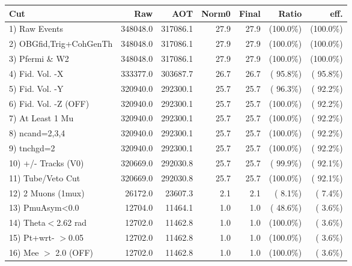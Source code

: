  \begin{table}[h!]\centering
 \begin{tabular}{||l||r|r|r|r|r|r||}
 \hline
 \hline
 Cut & Raw & AOT & Norm0 & Final & Ratio & eff.       \\
 \hline
  1) Raw Events           &     348048.0 &     317086.1 &         27.9 &         27.9 & (100.0\%) & (100.0\%) \\
  2) OBGfid,Trig+CohGenTh &     348048.0 &     317086.1 &         27.9 &         27.9 & (100.0\%) & (100.0\%) \\
  3) Pfermi \& W2         &     348048.0 &     317086.1 &         27.9 &         27.9 & (100.0\%) & (100.0\%) \\
  4) Fid. Vol. -X         &     333377.0 &     303687.7 &         26.7 &         26.7 & ( 95.8\%) & ( 95.8\%) \\
  5) Fid. Vol. -Y         &     320940.0 &     292300.1 &         25.7 &         25.7 & ( 96.3\%) & ( 92.2\%) \\
  6) Fid. Vol. -Z (OFF)   &     320940.0 &     292300.1 &         25.7 &         25.7 & (100.0\%) & ( 92.2\%) \\
  7) At Least 1 Mu        &     320940.0 &     292300.1 &         25.7 &         25.7 & (100.0\%) & ( 92.2\%) \\
  8) ncand=2,3,4          &     320940.0 &     292300.1 &         25.7 &         25.7 & (100.0\%) & ( 92.2\%) \\
  9) tnchgd=2             &     320940.0 &     292300.1 &         25.7 &         25.7 & (100.0\%) & ( 92.2\%) \\
 10) +/- Tracks (V0)      &     320669.0 &     292030.8 &         25.7 &         25.7 & ( 99.9\%) & ( 92.1\%) \\
 11) Tube/Veto Cut        &     320669.0 &     292030.8 &         25.7 &         25.7 & (100.0\%) & ( 92.1\%) \\
 12) 2 Muons (1mux)       &      26172.0 &      23607.3 &          2.1 &          2.1 & (  8.1\%) & (  7.4\%) \\
 13) PmuAsym<0.0          &      12704.0 &      11464.1 &          1.0 &          1.0 & ( 48.6\%) & (  3.6\%) \\
 14) Theta$<$2.62 rad     &      12702.0 &      11462.8 &          1.0 &          1.0 & (100.0\%) & (  3.6\%) \\
 15) Pt+wrt- $>$0.05      &      12702.0 &      11462.8 &          1.0 &          1.0 & (100.0\%) & (  3.6\%) \\
 16) Mee $>$ 2.0  (OFF)   &      12702.0 &      11462.8 &          1.0 &          1.0 & (100.0\%) & (  3.6\%) \\

\end{tabular}
\end{table}
